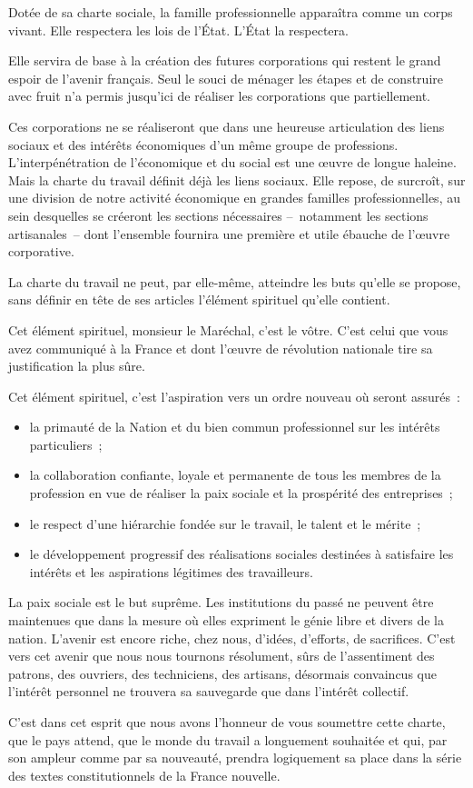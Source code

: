 \documentclass[french,twoside]{book} %
\begin{document}
Dotée de sa charte sociale, la famille professionnelle apparaîtra comme un corps vivant. Elle respectera les lois de l’État. L’État la respectera.\par
Elle servira de base à la création des futures corporations qui restent le grand espoir de l’avenir français. Seul le souci de ménager les étapes et de construire avec fruit n’a permis jusqu’ici de réaliser les corporations que partiellement.\par
Ces corporations ne se réaliseront que dans une heureuse articulation des liens sociaux et des intérêts économiques d’un même groupe de professions. L’interpénétration de l’économique et du social est une œuvre de longue haleine. Mais la charte du travail définit déjà les liens sociaux. Elle repose, de surcroît, sur une division de notre activité économique en grandes familles professionnelles, au sein desquelles se créeront les sections nécessaires – notamment les sections artisanales – dont l’ensemble fournira une première et utile ébauche de l’œuvre corporative.\par
La charte du travail ne peut, par elle-même, atteindre les buts qu’elle se propose, sans définir en tête de ses articles l’élément spirituel qu’elle contient.\par
Cet élément spirituel, monsieur le Maréchal, c’est le vôtre. C’est celui que vous avez communiqué à la France et dont l’œuvre de révolution nationale tire sa justification la plus sûre.\par
Cet élément spirituel, c’est l’aspiration vers un ordre nouveau où seront assurés :\par

\begin{itemize}[itemsep=0pt,]
\item la primauté de la Nation et du bien commun professionnel sur les intérêts particuliers ;
\item la collaboration confiante, loyale et permanente de tous les membres de la profession en vue de réaliser la paix sociale et la prospérité des entreprises ;
\item le respect d’une hiérarchie fondée sur le travail, le talent et le mérite ;
\item le développement progressif des réalisations sociales destinées à satisfaire les intérêts et les aspirations légitimes des travailleurs.
\end{itemize}
\noindent La paix sociale est le but suprême. Les institutions du passé ne peuvent être maintenues que dans la mesure où elles expriment le génie libre et divers de la nation. L’avenir est encore riche, chez nous, d’idées, d’efforts, de sacrifices. C’est vers cet avenir que nous nous tournons résolument, sûrs de l’assentiment des patrons, des ouvriers, des techniciens, des artisans, désormais convaincus que l’intérêt personnel ne trouvera sa sauvegarde que dans l’intérêt collectif.\par
C’est dans cet esprit que nous avons l’honneur de vous soumettre cette charte, que le pays attend, que le monde du travail a longuement souhaitée et qui, par son ampleur comme par sa nouveauté, prendra logiquement sa place dans la série des textes constitutionnels de la France nouvelle.
\renewcommand{\leftmark}{Titre I\emph{er.} \\
Principes généraux}
\end{document}
